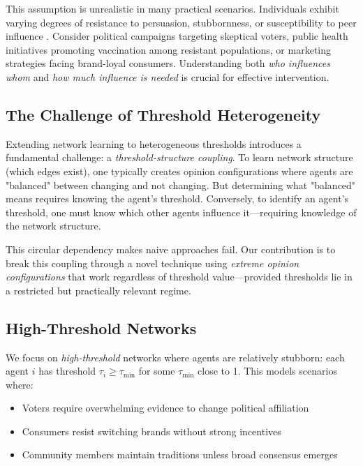 \documentclass[conference]{IEEEtran}
\begin{document}
This assumption is unrealistic in many practical scenarios. Individuals exhibit varying degrees of resistance to persuasion, stubbornness, or susceptibility to peer influence \cite{granovetter1978threshold}. Consider political campaigns targeting skeptical voters, public health initiatives promoting vaccination among resistant populations, or marketing strategies facing brand-loyal consumers. Understanding both \emph{who influences whom} and \emph{how much influence is needed} is crucial for effective intervention.

\subsection{The Challenge of Threshold Heterogeneity}

Extending network learning to heterogeneous thresholds introduces a fundamental challenge: a \emph{threshold-structure coupling}. To learn network structure (which edges exist), one typically creates opinion configurations where agents are "balanced" between changing and not changing. But determining what "balanced" means requires knowing the agent's threshold. Conversely, to identify an agent's threshold, one must know which other agents influence it—requiring knowledge of the network structure.

This circular dependency makes naive approaches fail. Our contribution is to break this coupling through a novel technique using \emph{extreme opinion configurations} that work regardless of threshold value—provided thresholds lie in a restricted but practically relevant regime.

\subsection{High-Threshold Networks}

We focus on \emph{high-threshold} networks where agents are relatively stubborn: each agent $i$ has threshold $\tau_i \geq \tau_{\min}$ for some $\tau_{\min}$ close to 1. This models scenarios where:
\begin{itemize}
\item Voters require overwhelming evidence to change political affiliation
\item Consumers resist switching brands without strong incentives  
\item Community members maintain traditions unless broad consensus emerges
\end{itemize}
\end{document}
